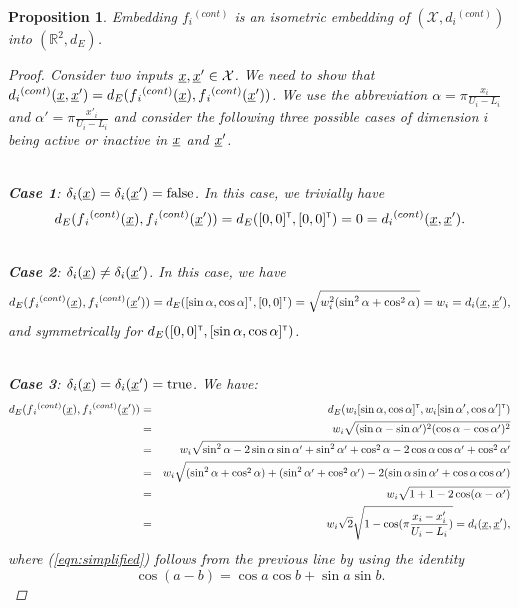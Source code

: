 \documentclass[letterpaper]{article}
\newcommand{\vect}[1]{\underline{\smash{#1}}}
\renewcommand{\v}[1]{\vect{#1}}
\newcommand{\reals}{\mathds{R}}
\newcommand{\sX}{\mathcal{X}}
\newcommand\transpose{{\textrm{\tiny{\sf{T}}}}}
\newtheorem{prop}[thm]{Proposition}
\begin{document}
\begin{prop}Embedding $f{_i}^{(cont)}$ is an isometric embedding of $(\sX, d{_i}^{(cont)})$ into $(\reals^2, d_E)$.
\label{prop:f_d_cont_isometric}
\begin{proof}
Consider two inputs $\v{x},\v{x}' \in \sX$. We need to show that $d{_i}^{(cont)}(\v{x},\v{x}') = d_E(f{_i}^{(cont)}(\v{x}),f{_i}^{(cont)}(\v{x}'))$.
We use the abbreviation $\alpha = \pi\frac{x_i}{U_i-L_i}$ and $\alpha' = \pi\frac{x'_i}{U_i-L_i}$ and consider the following three possible cases of dimension $i$ being active or inactive in $\v{x}$ and $\v{x}'$.

~\\\noindent{}\textbf{Case 1}: $\delta_i(\v{x}) = \delta_i(\v{x}') = \textrm{false}$.
In this case, we trivially have 
\[d_E(f{_i}^{(cont)}(\v{x}),f{_i}^{(cont)}(\v{x}')) = d_E([0,0]^\transpose, [0,0]^\transpose) = 0 = d{_i}^{(cont)}(\v{x},\v{x}').\]

~\\\noindent{}\textbf{Case 2}: $\delta_i(\v{x}) \neq \delta_i(\v{x}')$. In this case, we have
\[d_E(f{_i}^{(cont)}(\v{x}),f{_i}^{(cont)}(\v{x}')) = d_E([\sin{\alpha}, \cos{\alpha}]^\transpose, [0,0]^\transpose) = \sqrt{w_i^2 (\sin^2{\alpha} + \cos^2{\alpha})} = w_i = d_i(\v{x},\v{x}'),\]
and symmetrically for $d_E([0,0]^\transpose, [\sin{\alpha}, \cos{\alpha}]^\transpose)$.

~\\\noindent{}\textbf{Case 3}: $\delta_i(\v{x}) = \delta_i(\v{x}') = \textrm{true}$. We have:
\begin{eqnarray}
\nonumber{}d_E(f{_i}^{(cont)}(\v{x}),f{_i}^{(cont)}(\v{x}')) & = & d_E(w_i [\sin{\alpha}, \cos{\alpha}]^\transpose, w_i [\sin{\alpha'}, \cos{\alpha'}]^\transpose)\\ 
\nonumber{}& = & w_i \sqrt{(\sin{\alpha}-\sin{\alpha'})^2 (\cos{\alpha}-\cos{\alpha'})^2}\\
\nonumber{}& = & w_i \sqrt{\sin^2{\alpha} -2 \sin{\alpha}\sin{\alpha'} + \sin^2{\alpha'}  + \cos^2{\alpha} -2 \cos{\alpha}\cos{\alpha'} + \cos^2{\alpha'} }\\
\nonumber{}& = & w_i \sqrt{(\sin^2{\alpha}+\cos^2{\alpha})   +  (\sin^2{\alpha'}+\cos^2{\alpha'})   -2 (\sin{\alpha}\sin{\alpha'} + \cos{\alpha}\cos{\alpha'})}\\
\label{eqn:simplified}& = & w_i \sqrt{ 1+1-2 \cos(\alpha-\alpha')}\\
\nonumber{}& = & w_i \sqrt{2} \sqrt{1 - \cos(\pi \frac{x_i-x_i'}{U_i-L_i})} = d_i(\v{x}, \v{x}'),
\end{eqnarray}
where (\ref{eqn:simplified}) follows from the previous line by using the identity 
\[\cos{(a-b)} = \cos{a}\cos{b} + \sin{a}\sin{b}.\]
\end{proof}
\end{prop}
\end{document}
